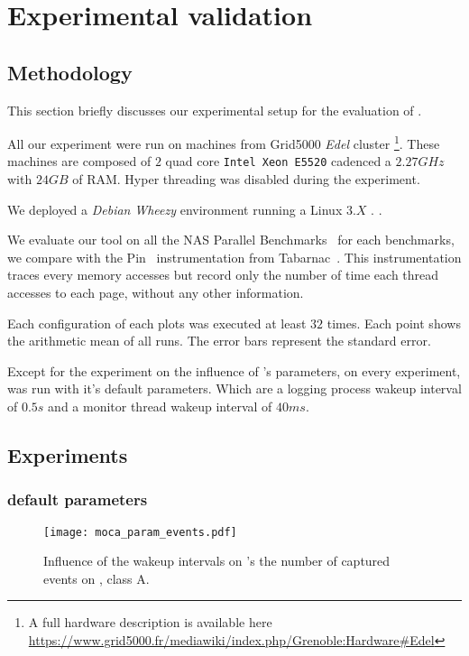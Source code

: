 \section{Experimental validation}
\label{sec:expe}

\subsection{Methodology}
\label{sec:exp-methodo}

This section briefly discusses our experimental setup for the evaluation of
\Moca.

All our experiment were run on  machines from Grid5000 \emph{Edel} cluster
\footnote{A full hardware description is available here
    \url{https://www.grid5000.fr/mediawiki/index.php/Grenoble:Hardware\#Edel}}.
    These machines are composed of $2$ quad core \texttt{Intel Xeon E5520}
    cadenced a $2.27GHz$ with
    $24 GB$ of RAM. Hyper threading was disabled during the experiment.

We deployed a \emph{Debian} \emph{Wheezy} environment running a Linux $3.X$
.
.

We evaluate our tool on all the NAS Parallel Benchmarks~\cite{Jin1999} for
each benchmarks, we compare \Moca with the Pin~\cite{Luk05Pin} instrumentation
from Tabarnac~\cite{Beniamine15TABARNACRR}. This instrumentation traces every
memory accesses but record only the number of time each thread accesses to
each page, without any other information.

Each configuration of each plots was executed at least $32$ times. Each point
shows the arithmetic mean of all runs. The error bars represent
the standard error.

Except for the experiment on the influence of \Moca's parameters, on every
experiment, \Moca was run with it's default parameters. Which are a logging
process wakeup interval of $0.5s$ and a monitor thread wakeup interval
of $40ms$.


\subsection{Experiments}
\label{sec:expe-ovh}

\subsubsection{\Moca default parameters}

\begin{figure}[htb]
    \centering
    \texttt{[image: moca\_param\_events.pdf]}
    \caption{Influence of the wakeup intervals on \Moca's the number of
    captured events on \FT, class A.}
    \label{fig:param_evts}
\end{figure}

